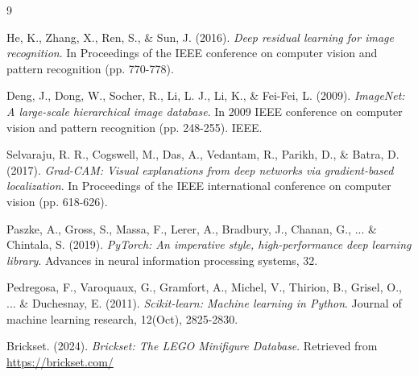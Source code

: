 \documentclass[11pt, a4paper]{article}
\newtheorem{assumption}{Assumption}
\theoremstyle{remark}
\newtheorem{remark}{Remark}
\begin{document}
\begin{thebibliography}{9}

He, K., Zhang, X., Ren, S., \& Sun, J. (2016). 
\textit{Deep residual learning for image recognition}. 
In Proceedings of the IEEE conference on computer vision and pattern recognition (pp. 770-778).

Deng, J., Dong, W., Socher, R., Li, L. J., Li, K., \& Fei-Fei, L. (2009). 
\textit{ImageNet: A large-scale hierarchical image database}. 
In 2009 IEEE conference on computer vision and pattern recognition (pp. 248-255). IEEE.

Selvaraju, R. R., Cogswell, M., Das, A., Vedantam, R., Parikh, D., \& Batra, D. (2017). 
\textit{Grad-CAM: Visual explanations from deep networks via gradient-based localization}. 
In Proceedings of the IEEE international conference on computer vision (pp. 618-626).

Paszke, A., Gross, S., Massa, F., Lerer, A., Bradbury, J., Chanan, G., ... \& Chintala, S. (2019). 
\textit{PyTorch: An imperative style, high-performance deep learning library}. 
Advances in neural information processing systems, 32.

Pedregosa, F., Varoquaux, G., Gramfort, A., Michel, V., Thirion, B., Grisel, O., ... \& Duchesnay, E. (2011). 
\textit{Scikit-learn: Machine learning in Python}. 
Journal of machine learning research, 12(Oct), 2825-2830.

Brickset. (2024). \textit{Brickset: The LEGO Minifigure Database}. 
Retrieved from \url{https://brickset.com/}

\end{thebibliography}




\end{document}
